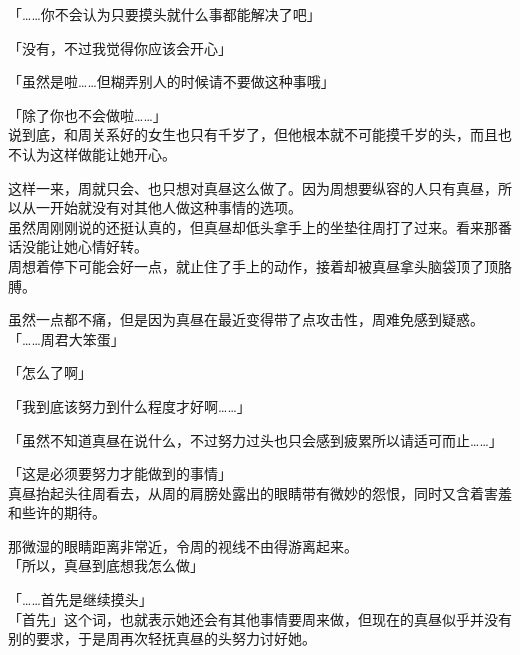 「……你不会认为只要摸头就什么事都能解决了吧」

「没有，不过我觉得你应该会开心」

「虽然是啦……但糊弄别人的时候请不要做这种事哦」

「除了你也不会做啦……」\\

说到底，和周关系好的女生也只有千岁了，但他根本就不可能摸千岁的头，而且也不认为这样做能让她开心。

这样一来，周就只会、也只想对真昼这么做了。因为周想要纵容的人只有真昼，所以从一开始就没有对其他人做这种事情的选项。\\

虽然周刚刚说的还挺认真的，但真昼却低头拿手上的坐垫往周打了过来。看来那番话没能让她心情好转。\\

周想着停下可能会好一点，就止住了手上的动作，接着却被真昼拿头脑袋顶了顶胳膊。

虽然一点都不痛，但是因为真昼在最近变得带了点攻击性，周难免感到疑惑。\\

「……周君大笨蛋」

「怎么了啊」

「我到底该努力到什么程度才好啊……」

「虽然不知道真昼在说什么，不过努力过头也只会感到疲累所以请适可而止……」

「这是必须要努力才能做到的事情」\\

真昼抬起头往周看去，从周的肩膀处露出的眼睛带有微妙的怨恨，同时又含着害羞和些许的期待。

那微湿的眼睛距离非常近，令周的视线不由得游离起来。\\

「所以，真昼到底想我怎么做」

「……首先是继续摸头」\\

「首先」这个词，也就表示她还会有其他事情要周来做，但现在的真昼似乎并没有别的要求，于是周再次轻抚真昼的头努力讨好她。
